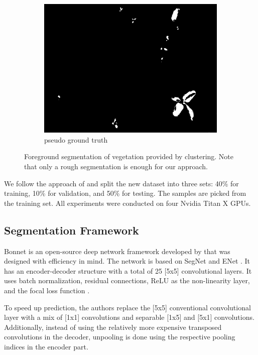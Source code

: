 \documentclass[letterpaper, 10 pt, conference]{ieeeconf}  %
\begin{document}
\begin{figure}
\begin{subfigure}[b]{0.31\linewidth}
    \includegraphics[width=\linewidth]{pics/unsupervised/lbl_masks_8mm_fromImages_frame256.png}
   		\caption{pseudo ground truth}
		\label{unsup_lbl}    		
   \end{subfigure}
    \caption{Foreground segmentation of vegetation provided by clustering. Note that only a rough segmentation is enough for our approach.}
    \label{fig:unsupervised_foreground}
\end{figure}


We follow the approach of \cite{milioto2018real} and split the new dataset into three sets: 40\% for training, 10\% for validation, and 50\% for testing. The samples are picked from the training set. All experiments were conducted on four Nvidia Titan X GPUs.  


\subsection{Segmentation Framework} \label{sec:seg_framework}


Bonnet is an open-source deep network framework developed by \cite{milioto2018bonnet} that was designed with efficiency in mind. The network is based on SegNet \cite{badrinarayanan2017segnet} and ENet \cite{paszke2016enet}. It has an encoder-decoder structure with a total of 25 [5x5] convolutional layers. It uses batch normalization, residual connections, ReLU as the non-linearity layer, and the focal loss function \cite{DBLP:conf/iccv/LinGGHD17}.

To speed up prediction, the authors replace the [5x5] conventional convolutional layer with a mix of [1x1] convolutions and separable [1x5] and [5x1] convolutions. Additionally, instead of using the relatively more expensive transposed convolutions in the decoder, unpooling is done using the respective pooling indices in the encoder part.
\end{document}

